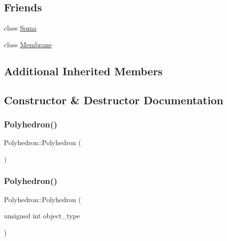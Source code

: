 \subsection*{Friends}
\begin{DoxyCompactItemize}
\item 
class \mbox{\hyperlink{classPolyhedron_aaa07b7b364b620b9a781f30a5cd9f5ea}{Soma}}
\item 
class \mbox{\hyperlink{classPolyhedron_ac790db405644a01723104c3c0c8128bb}{Membrane}}
\end{DoxyCompactItemize}
\subsection*{Additional Inherited Members}


\subsection{Constructor \& Destructor Documentation}
\mbox{\label{classPolyhedron_aebdf7ee85eb636069bf93afb4e6a483f}} 
\subsubsection{\texorpdfstring{Polyhedron()}{Polyhedron()}\hspace{0.1cm}{\footnotesize\ttfamily [1/4]}}
{\footnotesize\ttfamily Polyhedron\+::\+Polyhedron (\begin{DoxyParamCaption}{ }\end{DoxyParamCaption})\hspace{0.3cm}{\ttfamily [inline]}}

\mbox{\label{classPolyhedron_a304950efef7fb67203d8136578b42535}} 
\subsubsection{\texorpdfstring{Polyhedron()}{Polyhedron()}\hspace{0.1cm}{\footnotesize\ttfamily [2/4]}}
{\footnotesize\ttfamily Polyhedron\+::\+Polyhedron (\begin{DoxyParamCaption}\item[{unsigned int}]{object\+\_\+type }\end{DoxyParamCaption})\hspace{0.3cm}{\ttfamily [inline]}}

